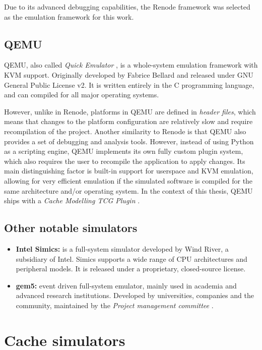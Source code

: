 \noindent Due to its advanced debugging capabilities, the Renode framework was selected as the emulation framework for this work.

\subsection{QEMU}

QEMU, also called \textit{Quick Emulator} \cite{qemuoriginal}, is a whole-system emulation framework with KVM support. Originally developed by Fabrice Bellard \cite{qemufabrice} and released
under GNU General Public License v2. It is written entirely in the C programming language, and can compiled for all major operating systems.

However, unlike in Renode, platforms in QEMU are defined in \textit{header files}, which means
that changes to the platform configuration are relatively slow and require recompilation of the project. Another similarity to Renode is that QEMU also provides a set of debugging
and analysis tools. However, instead of using Python as a scripting engine, QEMU implements its own fully custom plugin system, which also requires the user to recompile the
application to apply changes. Its main distinguishing factor is built-in support for userspace and KVM emulation, allowing for very efficient emulation if the simulated software is
compiled for the same architecture and/or operating system. In the context of this thesis, QEMU ships with a \textit{Cache Modelling TCG Plugin} \cite{tcgcachemodelling}.

\subsection{Other notable simulators}

\begin{itemize}
	\item \textbf{Intel Simics:} is a full-system simulator developed by Wind River, a subsidiary of Intel. Simics supports a wide range of CPU architectures and peripheral models.
		It is released under a proprietary, closed-source license.
	\item \textbf{gem5:} event driven full-system emulator, mainly used in academia and advanced research institutions. Developed by universities, companies and the community, maintained by the
		\textit{Project management committee} \cite{gem5governance}.
\end{itemize}

\section{Cache simulators}

